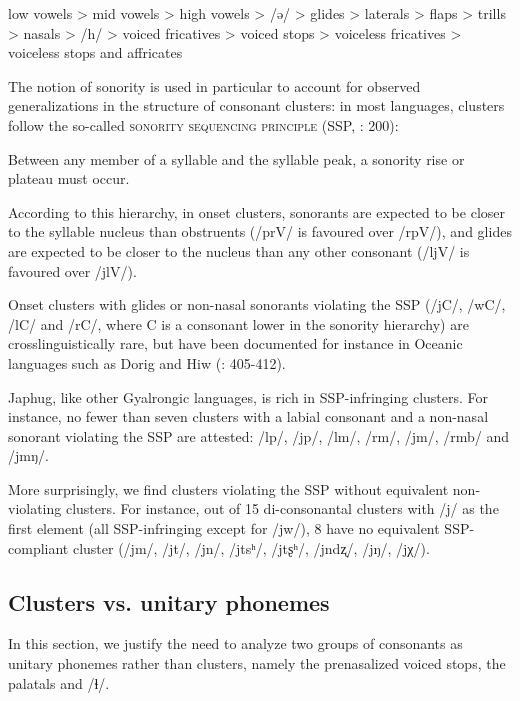 \documentclass[12pt]{article}
\newcommand{\ipa}[1]{\mbox{\phon/#1/}}
\renewcommand{\footnote}[1]{\endnote{\normalsize#1}}
\begin{document}
\begin{myexe}  
\ex    
\glt low vowels > mid vowels > high vowels > \ipa{ə} > glides > laterals > flaps
> trills > nasals > \ipa{h} > voiced fricatives > voiced stops > voiceless
fricatives > voiceless stops and affricates
\end{myexe}
The notion of sonority is used in particular to account for observed generalizations in the structure of consonant clusters: in most languages, clusters follow the so-called \textsc{sonority sequencing principle} (SSP, \citealt{blevins95syllable}: 200):

\begin{myexe}
\ex \label{ex:ssp}
\glt Between any member of a syllable and the syllable peak, a sonority
rise or plateau must occur.
\end{myexe}
According to this hierarchy, in onset clusters, sonorants are expected to be closer to the syllable nucleus than obstruents (\ipa{prV} is favoured over \ipa{rpV}), and glides are expected to be closer to the nucleus than any other consonant (\ipa{ljV} is favoured over \ipa{jlV}).

Onset clusters with glides or non-nasal sonorants violating the SSP (\ipa{jC}, \ipa{wC}, \ipa{lC} and \ipa{rC}, where C is a consonant lower in the sonority hierarchy) are crosslinguistically rare, but have been documented for instance in Oceanic languages such as Dorig and Hiw (\citealt{francois10gl}: 405-412). 

Japhug, like other Gyalrongic languages,\footnote{See e.g. \citet{jackson00puxi} and Lai (\citeyear{lai13affixale}: 25--29).} is rich in SSP-infringing  clusters. For instance, no fewer than seven clusters with a labial consonant and a non-nasal sonorant violating the SSP are attested:  \ipa{lp}, \ipa{jp}, \ipa{lm}, \ipa{rm}, \ipa{jm}, \ipa{rmb} and \ipa{jmŋ}. 

More surprisingly, we find clusters violating the SSP without equivalent non-violating clusters. For instance, out of 15 di-consonantal clusters with \ipa{j} as the first element (all SSP-infringing  except for \ipa{jw}), 8 have no equivalent SSP-compliant cluster (\ipa{jm}, \ipa{jt}, \ipa{jn}, \ipa{jtsʰ}, \ipa{jtʂʰ}, \ipa{jndʐ}, \ipa{jŋ}, \ipa{jχ}).

\subsection*{Clusters vs. unitary phonemes} \label{sec:non.clusters}
In this section, we justify the need to analyze two groups of consonants as unitary phonemes rather than clusters, namely the prenasalized voiced stops, the palatals and \ipa{ɬ}.
 
\end{document}
